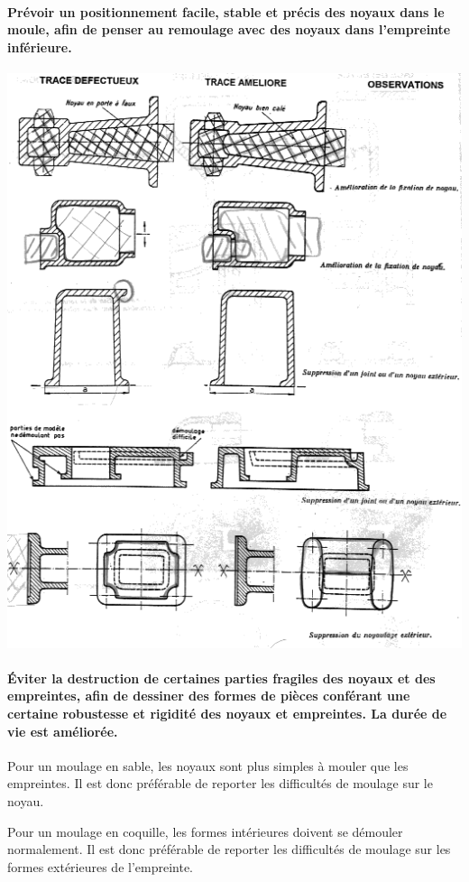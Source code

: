 \documentclass[11pt,oneside]{article}
\begin{document}
\paragraph*{Prévoir un positionnement facile, stable et précis des noyaux dans
le moule, afin de penser au remoulage avec des noyaux dans l'empreinte
inférieure.}

\begin{center}
 \includegraphics[width=.8\textwidth]{png/regles_noyau_2}
\end{center}

\paragraph*{Éviter la destruction de certaines parties fragiles des noyaux et
des empreintes, afin de dessiner des formes de pièces conférant une certaine
robustesse et rigidité des noyaux et empreintes. La durée de vie est améliorée.}


Pour un moulage en sable, les noyaux sont plus simples à mouler que les
empreintes. Il est donc préférable de reporter les difficultés de
moulage sur le noyau.

Pour un moulage en coquille, les formes intérieures doivent se démouler
normalement. Il est donc préférable de reporter les difficultés de
moulage sur les formes extérieures de l'empreinte. 
\end{document}
